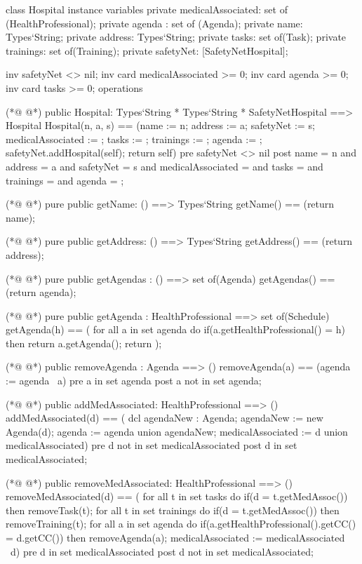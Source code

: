 \begin{vdmpp}[breaklines=true]
class Hospital
instance variables
  private medicalAssociated: set of (HealthProfessional);
  private agenda : set of (Agenda);
  private name: Types`String;
  private address: Types`String;
  private tasks: set of(Task);
  private trainings: set of(Training);
  private safetyNet: [SafetyNetHospital];
 
 inv safetyNet <> nil; 
 inv card medicalAssociated >= 0;
 inv card agenda >= 0;
 inv card tasks >= 0;
operations

(*@
\label{Hospital:17}
@*)
 public Hospital: Types`String * Types`String * SafetyNetHospital ==> Hospital
  Hospital(n, a, s) == (name := n; address := a; safetyNet := s; medicalAssociated := {}; tasks := {}; trainings := {}; agenda := {};
  safetyNet.addHospital(self); return self)
 pre safetyNet <> nil
 post name = n and address = a and safetyNet = s and medicalAssociated = {} and tasks = {} and trainings = {} and agenda = {};
 
(*@
\label{getName:23}
@*)
 pure public getName: () ==> Types`String
  getName() == (return name);
 
(*@
\label{getAddress:26}
@*)
 pure public getAddress: () ==> Types`String
  getAddress() == (return address);
 
(*@
\label{getAgendas:29}
@*)
 pure public getAgendas : () ==> set of(Agenda)
  getAgendas() == (return agenda);
  
(*@
\label{getAgenda:32}
@*)
 pure public getAgenda : HealthProfessional ==> set of(Schedule)
  getAgenda(h) == (
   for all a in set agenda do
    if(a.getHealthProfessional() = h)
     then return a.getAgenda();
   return {});
 
(*@
\label{removeAgenda:39}
@*)
 public removeAgenda : Agenda ==> ()
  removeAgenda(a) == (agenda := agenda \ {a})
 pre a in set agenda
 post a not in set agenda;
 
(*@
\label{addMedAssociated:44}
@*)
 public addMedAssociated: HealthProfessional ==> ()
  addMedAssociated(d) == (
   dcl agendaNew : Agenda;
   agendaNew := new Agenda(d);
   agenda := agenda union {agendaNew};
   medicalAssociated := {d} union medicalAssociated)
 pre d not in set medicalAssociated
 post d in set medicalAssociated;
  
(*@
\label{removeMedAssociated:53}
@*)
 public removeMedAssociated: HealthProfessional ==> ()
  removeMedAssociated(d) == (
   for all t in set tasks do
    if(d = t.getMedAssoc())
     then removeTask(t);
   for all t in set trainings do
    if(d = t.getMedAssoc())
     then removeTraining(t);
   for all a in set agenda do
    if(a.getHealthProfessional().getCC() = d.getCC())
     then removeAgenda(a);
   medicalAssociated := medicalAssociated \ {d})
 pre d in set medicalAssociated
 post d not in set medicalAssociated;
 

\end{vdmpp}
